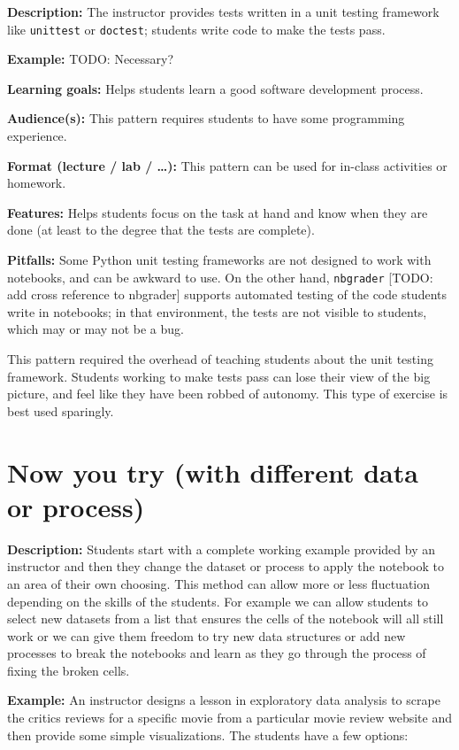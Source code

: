 \documentclass[]{book}
\begin{document}
\textbf{Description:} The instructor provides tests written in a unit
testing framework like \texttt{unittest} or \texttt{doctest}; students
write code to make the tests pass.

\textbf{Example:} TODO: Necessary?

\textbf{Learning goals:} Helps students learn a good software
development process.

\textbf{Audience(s):} This pattern requires students to have some
programming experience.

\textbf{Format (lecture / lab / \ldots{}):} This pattern can be used for
in-class activities or homework.

\textbf{Features:} Helps students focus on the task at hand and know
when they are done (at least to the degree that the tests are complete).

\textbf{Pitfalls:} Some Python unit testing frameworks are not designed
to work with notebooks, and can be awkward to use. On the other hand,
\texttt{nbgrader} {[}TODO: add cross reference to nbgrader{]} supports
automated testing of the code students write in notebooks; in that
environment, the tests are not visible to students, which may or may not
be a bug.

This pattern required the overhead of teaching students about the unit
testing framework. Students working to make tests pass can lose their
view of the big picture, and feel like they have been robbed of
autonomy. This type of exercise is best used sparingly.

\section{Now you try (with different data or
process)}\label{now-you-try-with-different-data-or-process}

\textbf{Description:} Students start with a complete working example
provided by an instructor and then they change the dataset or process to
apply the notebook to an area of their own choosing. This method can
allow more or less fluctuation depending on the skills of the students.
For example we can allow students to select new datasets from a list
that ensures the cells of the notebook will all still work or we can
give them freedom to try new data structures or add new processes to
break the notebooks and learn as they go through the process of fixing
the broken cells.

\textbf{Example:} An instructor designs a lesson in exploratory data
analysis to scrape the critics reviews for a specific movie from a
particular movie review website and then provide some simple
visualizations. The students have a few options:
\end{document}
